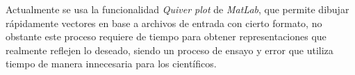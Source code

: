 Actualmente se usa la funcionalidad \emph{Quiver plot} de \emph{MatLab}, que permite dibujar rápidamente vectores en base a archivos de entrada con cierto formato, no obstante este proceso requiere de tiempo para obtener representaciones que realmente reflejen lo deseado, siendo un proceso de ensayo y error que utiliza tiempo de manera innecesaria para los científicos.




